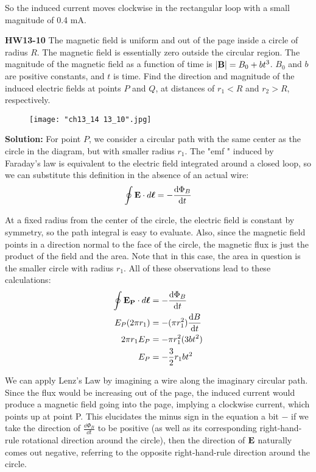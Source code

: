 \documentclass{article}
\begin{document}
So the induced current moves clockwise in the rectangular loop with a small magnitude of 0.4 mA. %
\pagebreak

\textbf{HW13-10} The magnetic field is uniform and out of the page inside a circle of radius $R$. The magnetic field is essentially zero outside the circular region. The magnitude of the magnetic field as a function of time is $|\vb{B}| = B_0 + bt^3$. $B_0$ and $b$ are positive constants, and $t$ is time. Find the direction and magnitude of the induced electric fields at points $P$ and $Q$, at distances of $r_1 < R$ and $r_2 > R$, respectively.

\begin{figure}[H]
	\centering
	\texttt{[image: "ch13\_14 13\_10".jpg]}
\end{figure}

\textbf{Solution:} For point $P$, we consider a circular path with the same center as the circle in the diagram, but with smaller radius $r_1$. The "emf " induced by Faraday's law is equivalent to the electric field integrated around a closed loop, so we can substitute this definition in the absence of an actual wire:
\[ \oint\vb{E}\cdot d\vb*{\ell} = -\frac{\dd \Phi_B}{\dd t}\]

At a fixed radius from the center of the circle, the electric field is constant by symmetry, so the path integral is easy to evaluate. Also, since the magnetic field points in a direction normal to the face of the circle, the magnetic flux is just the product of the field and the area. Note that in this case, the area in question is the smaller circle with radius $r_1$. All of these observations lead to these calculations:
\begin{equation*}
\begin{aligned}
\oint\vb{E_P}\cdot d\vb*{\ell} &= -\frac{\dd \Phi_B}{\dd t} \\
E_P(2\pi r_1) &= -(\pi r_1^2)\frac{\dd B}{\dd t} \\
2\pi r_1E_P &= -\pi r_1^2 (3bt^2) \\
E_P &= -\frac{3}{2}r_1bt^2
\end{aligned}
\end{equation*}

We can apply Lenz's Law by imagining a wire along the imaginary circular path. Since the flux would be increasing out of the page, the induced current would produce a magnetic field going into the page, implying a clockwise current, which points up at point P. This elucidates the minus sign in the equation a bit $-$ if we take the direction of $\frac{\dd \Phi_B}{\dd t}$ to be positive (as well as its corresponding right-hand-rule rotational direction around the circle), then the direction of $\vb{E}$ naturally comes out negative, referring to the opposite right-hand-rule direction around the circle.
\end{document}
